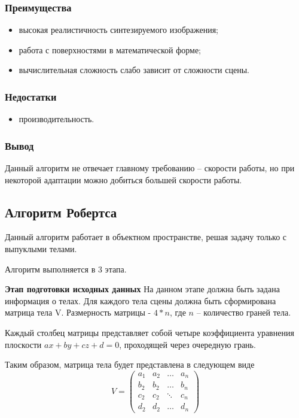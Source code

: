 \subsubsection*{Преимущества}
\begin{itemize}
\item	высокая реалистичность синтезируемого изображения;
\item	работа с поверхностями в математической форме;
\item	вычислительная сложность слабо зависит от сложности сцены.
\end{itemize}

\subsubsection*{Недостатки}
\begin{itemize}
\item	производительность.
\end{itemize}


\subsubsection*{Вывод}
Данный алгоритм не отвечает главному требованию – скорости работы, но при некоторой адаптации можно добиться большей скорости работы. 



\subsection*{Алгоритм Робертса}
Данный алгоритм работает в объектном пространстве, решая задачу только с выпуклыми телами.

Алгоритм выполняется в 3 этапа.

\textbf{Этап подготовки исходных данных}
На данном этапе должна быть задана информация о телах. Для каждого тела сцены должна быть сформирована матрица тела V. Размерность матрицы - $4*n$, где $n$ – количество граней тела.

Каждый столбец матрицы представляет собой четыре коэффициента уравнения плоскости  $ax+by+cz+d=0$, проходящей через очередную грань.

Таким образом, матрица тела будет представлена в следующем виде
\begin{equation}
	\label{eq:matr}
	V = \begin{pmatrix}
		a_{1} & a_{2} & \ldots & a_{n}\\
		b_{2} & b_{2} & \ldots & b_{n}\\
		c_{2} & c_{2} & \ddots & c_{n}\\
		d_{2} & d_{2} & \ldots & d_{n}
	\end{pmatrix}
\end{equation}

